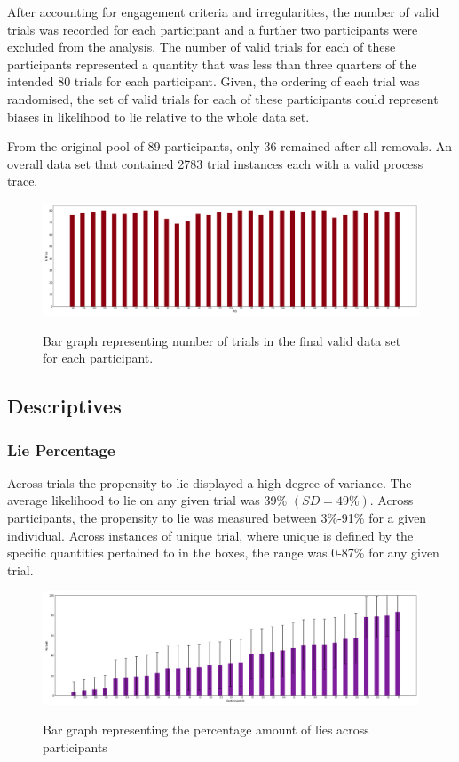 \documentclass[man, floatsintext]{apa7}
\begin{document}
After accounting for engagement criteria and irregularities, the number of valid trials was recorded for each participant and a further two participants were excluded from the analysis. The number of valid trials for each of these participants represented a quantity that was less than three quarters of the intended 80 trials for each participant. Given, the ordering of each trial was randomised, the set of valid trials for each of these participants could represent biases in likelihood to lie relative to the whole data set.

From the original pool of 89 participants, only 36 remained after all removals. An overall data set that contained 2783 trial instances each with a valid process trace.

\begin{figure}[H]
	\includegraphics[width=\linewidth]{../plots/RESPONSE/NTrialsByPID.png}
	\label{fig:NTrialsByPID}
	\caption{Bar graph representing number of trials in the final valid data set for each participant.}
\end{figure}

\subsection{Descriptives}

\subsubsection{Lie Percentage}

Across trials the propensity to lie displayed a high degree of variance. The average likelihood to lie on any given trial was 39\% $(SD = 49\%)$. Across participants, the propensity to lie was measured between 3\%-91\% for a given individual. Across instances of unique trial, where unique is defined by the specific quantities pertained to in the boxes, the range was 0-87\% for any given trial.

\begin{figure}[H]
	\includegraphics[width=\linewidth]{../plots/RESPONSE/PIDPercentLiesPlot.png}
	\label{fig:PIDPercentLiesPlot}
	\caption{Bar graph representing the percentage amount of lies across participants}
\end{figure}
\end{document}
